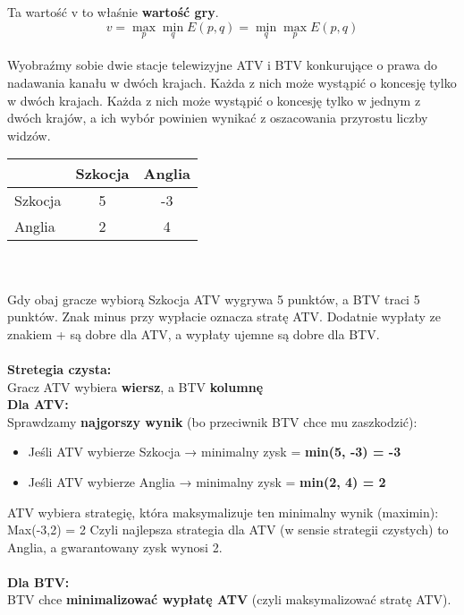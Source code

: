 \documentclass[12pt]{article}
\begin{document}
Ta wartość v to właśnie \textbf{wartość gry}.
\begin{equation}
\displaystyle v = \max_{p} \displaystyle \min_{q} E(p,q) = \displaystyle \min_{q} \displaystyle \max_{p} E(p,q)
\end{equation}
\\
Wyobraźmy sobie dwie stacje telewizyjne ATV i BTV konkurujące o prawa do nadawania kanału w dwóch krajach. Każda z nich może wystąpić o koncesję tylko w dwóch krajach. Każda z nich może wystąpić o koncesję tylko w jednym z dwóch krajów, a  ich wybór powinien wynikać z oszacowania przyrostu liczby widzów.
\begin{table}[h!]
\begin{center}
\begin{tabular}{|l|c|c|}
\hline
 & Szkocja & Anglia \\ \hline
Szkocja & 5 & -3 \\ \hline
Anglia & 2 & 4 \\ \hline
\end{tabular}
\end{center}
\end{table}
\\
\\
Gdy obaj gracze wybiorą Szkocja ATV wygrywa 5 punktów, a BTV traci 5 punktów. Znak minus przy wypłacie oznacza stratę ATV. Dodatnie wypłaty ze znakiem + są dobre dla ATV, a wypłaty ujemne są dobre dla BTV.
\\
\\
\textbf{Stretegia czysta:}
\\
Gracz ATV wybiera \textbf{wiersz}, a BTV \textbf{kolumnę}
\\ \textbf{Dla ATV:}
\\
Sprawdzamy\textbf{ najgorszy wynik} (bo przeciwnik BTV chce mu zaszkodzić):
\begin{itemize}
\item Jeśli ATV wybierze Szkocja → minimalny zysk = \textbf{min(5, -3) = -3}
\item Jeśli ATV wybierze Anglia → minimalny zysk =  \textbf{min(2, 4) = 2}
\end{itemize}
ATV wybiera strategię, która maksymalizuje ten minimalny wynik (maximin): Max(-3,2) = 2
Czyli najlepsza strategia dla ATV (w sensie strategii czystych) to Anglia,
a gwarantowany zysk wynosi 2.
\\
\\
\textbf{Dla BTV:}
\\
BTV chce \textbf{minimalizować wypłatę ATV} (czyli maksymalizować stratę ATV).
\end{document}
